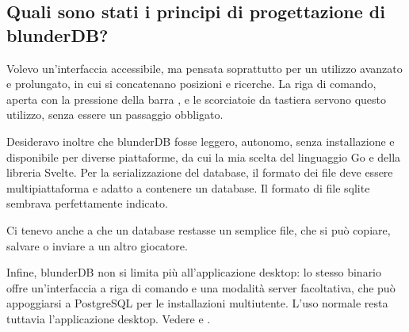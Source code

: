 \documentclass[letterpaper,10pt,italian]{sphinxmanual}
\begin{document}
\subsection{Quali sono stati i principi di progettazione di blunderDB?}
\label{\detokenize{faq:quelles-ont-ete-les-principes-de-conception-de-blunderdb}}
\sphinxAtStartPar
Volevo un’interfaccia accessibile, ma pensata soprattutto per un utilizzo avanzato e prolungato, in cui si concatenano posizioni e ricerche. La riga di comando, aperta con la pressione della barra , e le scorciatoie da tastiera servono questo utilizzo, senza essere un passaggio obbligato.

\sphinxAtStartPar
Desideravo inoltre che blunderDB fosse leggero, autonomo, senza installazione e disponibile per diverse piattaforme, da cui la mia scelta del linguaggio Go e della libreria Svelte. Per la serializzazione del database, il formato dei file deve essere multipiattaforma e adatto a contenere un database. Il formato di file sqlite sembrava perfettamente indicato.

\sphinxAtStartPar
Ci tenevo anche a che un database restasse un semplice file, che si può copiare, salvare o inviare a un altro giocatore.

\sphinxAtStartPar
Infine, blunderDB non si limita più all’applicazione desktop: lo stesso binario offre un’interfaccia a riga di comando e una modalità server facoltativa, che può appoggiarsi a PostgreSQL per le installazioni multiutente. L’uso normale resta tuttavia l’applicazione desktop. Vedere {\hyperref[\detokenize{cli:cli}]{}} e {\hyperref[\detokenize{mode_headless:headless}]{}}.
\end{document}
